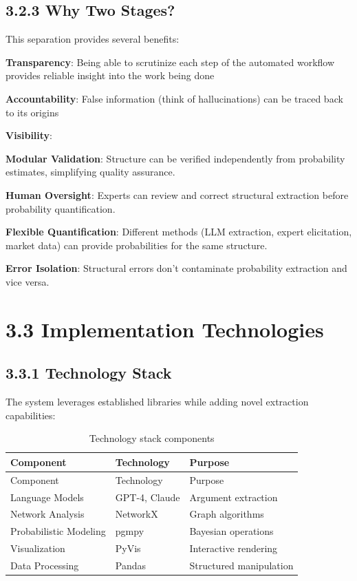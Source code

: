 \documentclass[
  11pt,
  letterpaper,
]{book}
\begin{document}
\subsection*{3.2.3 Why Two Stages?}\label{sec-why-two-stages}

This separation provides several benefits:

\textbf{Transparency}: Being able to scrutinize each step of the
automated workflow provides reliable insight into the work being done

\textbf{Accountability}: False information (think of hallucinations) can
be traced back to its origins

\textbf{Visibility}:

\textbf{Modular Validation}: Structure can be verified independently
from probability estimates, simplifying quality assurance.

\textbf{Human Oversight}: Experts can review and correct structural
extraction before probability quantification.

\textbf{Flexible Quantification}: Different methods (LLM extraction,
expert elicitation, market data) can provide probabilities for the same
structure.

\textbf{Error Isolation}: Structural errors don't contaminate
probability extraction and vice versa.

\section*{3.3 Implementation
Technologies}\label{sec-implementation-tech}


\subsection*{3.3.1 Technology Stack}\label{sec-tech-stack}

The system leverages established libraries while adding novel extraction
capabilities:

\begin{longtable}[]{@{}lll@{}}
\caption{Technology stack
components}\label{tbl-tech-stack}\tabularnewline
\toprule\noalign{}
Component & Technology & Purpose \\
\midrule\noalign{}
\endfirsthead
\toprule\noalign{}
Component & Technology & Purpose \\
\midrule\noalign{}
\endhead
\bottomrule\noalign{}
\endlastfoot
Language Models & GPT-4, Claude & Argument extraction \\
Network Analysis & NetworkX & Graph algorithms \\
Probabilistic Modeling & pgmpy & Bayesian operations \\
Visualization & PyVis & Interactive rendering \\
Data Processing & Pandas & Structured manipulation \\
\end{longtable}
\end{document}
